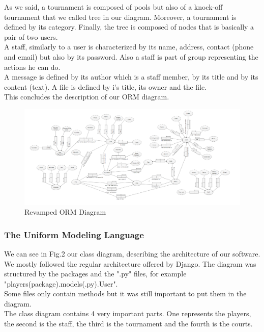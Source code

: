 \documentclass[a4paper, 12pt]{article}
\begin{document}
As we said, a tournament is composed of pools but also of a knock-off tournament that we called tree in our diagram. Moreover, a tournament is defined by its category. Finally, the tree is composed of nodes that is basically a pair of two users.\\

A staff, similarly to a user is characterized by its name, address, contact (phone and email) but also by its password. Also a staff is part of group representing the actions he can do. \\

A message is defined by its author which is a staff member, by its title and by its content (text). A file is defined by i's title, its owner and the file.\\

This concludes the description of our ORM diagram. 

\begin{figure}[ht!]
\caption{\label{orm2} Revamped ORM Diagram}
\includegraphics[scale=0.60, angle=90]{ormp2.png}
\end{figure}
\FloatBarrier


\subsubsection{The Uniform Modeling Language}
We can see in Fig.2 our class diagram, describing the architecture of our software. We mostly followed the regular architecture offered by Django. The diagram was structured by the packages and the ".py" files, for example "players(package).models(.py).User".\\

Some files only contain methods but it was still important to put them in the diagram.\\

The class diagram contains 4 very important parts. One represents the players, the second is the staff, the third is the tournament and the fourth is the courts.\\
\end{document}
